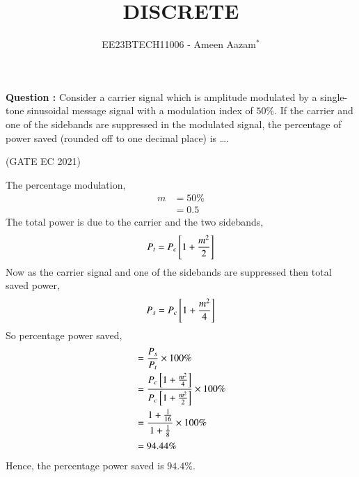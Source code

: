 \documentclass[journal,12pt,twocolumn]{IEEEtran}
\theoremstyle{remark}
\begin{document}

\vspace{3cm}

\title{DISCRETE}
\author{EE23BTECH11006 - Ameen Aazam$^{*}$%
}
\maketitle
\newpage
\bigskip

\renewcommand{\thefigure}{\theenumi}
\renewcommand{\thetable}{\theenumi}

\vspace{3cm}
\textbf{Question :}
Consider a carrier signal which is amplitude modulated by a single-tone sinusoidal message signal with a modulation index of $50\%$. If the carrier and one of the sidebands are suppressed in the modulated signal, the percentage of power saved (rounded off to one decimal place) is \ldots.

\hfill(GATE EC 2021)

\solution

The percentage modulation,
\begin{align}
    m&=50\% \\
    &=0.5
\end{align}
The total power is due to the carrier and the two sidebands,
\begin{align}
    P_t=P_c{}\left[1+\frac{m^2}{2}\right]
\end{align}
Now as the carrier signal and one of the sidebands are suppressed then total saved power,
\begin{align}
    P_s=P_c{}\left[1+\frac{m^2}{4}\right]
\end{align}
So percentage power saved,
\begin{align}
    &=\frac{P_s}{P_t}\times100\% \\
    &=\frac{P_c{}\left[1+\frac{m^2}{4}\right]}{P_c{}\left[1+\frac{m^2}{2}\right]}\times100\% \\
    &=\frac{1+\frac{1}{16}}{1+\frac{1}{8}}\times100\% \\
    &=94.44\%
\end{align}
Hence, the percentage power saved is $94.4\%$.
\end{document}
